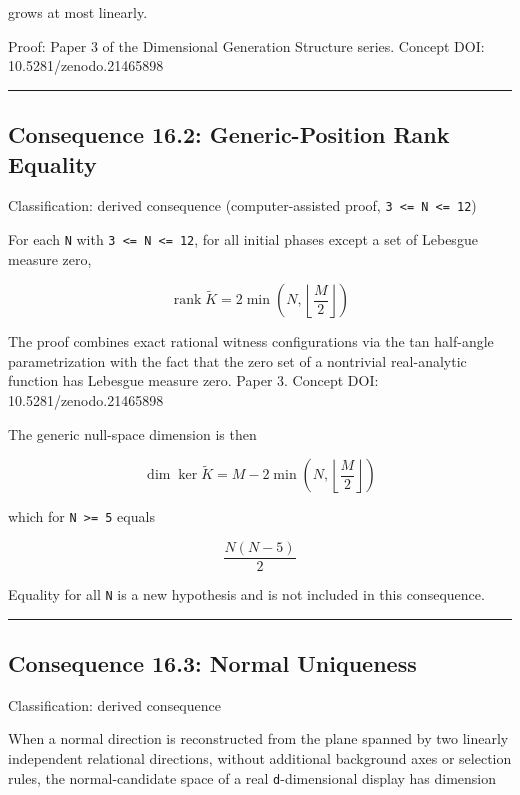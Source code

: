 \documentclass[
  a4paper,
]{article}
\begin{document}
grows at most linearly.

Proof: Paper 3 of the Dimensional Generation Structure series. Concept
DOI: 10.5281/zenodo.21465898

\begin{center}\rule{0.5\linewidth}{0.5pt}\end{center}

\subsection{Consequence 16.2: Generic-Position Rank
Equality}\label{consequence-16.2-generic-position-rank-equality}

Classification: derived consequence (computer-assisted proof,
\texttt{3\ \textless{}=\ N\ \textless{}=\ 12})

For each \texttt{N} with \texttt{3\ \textless{}=\ N\ \textless{}=\ 12},
for all initial phases except a set of Lebesgue measure zero,

\[
\operatorname{rank}\widetilde K
=
2\min\!\left(N,\left\lfloor\frac{M}{2}\right\rfloor\right)
\]

The proof combines exact rational witness configurations via the tan
half-angle parametrization with the fact that the zero set of a
nontrivial real-analytic function has Lebesgue measure zero. Paper 3.
Concept DOI: 10.5281/zenodo.21465898

The generic null-space dimension is then

\[
\dim\ker\widetilde K
=
M-2\min\!\left(N,\left\lfloor\frac{M}{2}\right\rfloor\right)
\]

which for \texttt{N\ \textgreater{}=\ 5} equals

\[
\frac{N(N-5)}{2}
\]

Equality for all \texttt{N} is a new hypothesis and is not included in
this consequence.

\begin{center}\rule{0.5\linewidth}{0.5pt}\end{center}

\subsection{Consequence 16.3: Normal
Uniqueness}\label{consequence-16.3-normal-uniqueness}

Classification: derived consequence

When a normal direction is reconstructed from the plane spanned by two
linearly independent relational directions, without additional
background axes or selection rules, the normal-candidate space of a real
\texttt{d}-dimensional display has dimension
\end{document}
